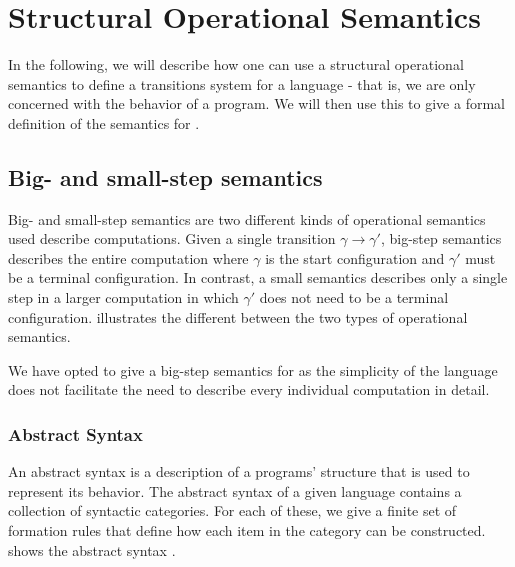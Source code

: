 \section{Structural Operational Semantics}
In the following, we will describe how one can use a structural operational semantics to define a transitions system for a language - that is, we are only concerned with the behavior of a program.
We will then use this to give a formal definition of the semantics for \dazel{}.

\subsection{Big- and small-step semantics}
Big- and small-step semantics are two different kinds of operational semantics used describe computations.
Given a single transition $\gamma \rightarrow \gamma' $, big-step semantics describes the entire computation where $\gamma$ is the start configuration and $\gamma'$ must be a terminal configuration. 
In contrast, a small semantics describes only a single step in a larger computation in which $\gamma'$ does not need to be a terminal configuration. 
 illustrates the different between the two types of operational semantics\cite{huttelTransitionsTreesIntroduction2010}.


We have opted to give a big-step semantics for \dazel{} as the simplicity of the language does not facilitate the need to describe every individual computation in detail.  
\subsubsection*{Abstract Syntax}
An abstract syntax is a description of a programs' structure that is used to represent its behavior. 
The abstract syntax of a given language contains a collection of syntactic categories. 
For each of these, we give a finite set of formation rules that define how each item in the category can be constructed.
 shows the abstract syntax \dazel{}.


